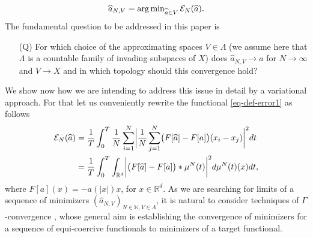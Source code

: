 \begin{equation}\label{fdproxy}
\widehat a_{N,V} = \operatorname{arg\,min}_{\widehat a \in V} \mathcal E_N(\widehat a).
\end{equation}
The fundamental question to be addressed in this paper is
\begin{itemize}
\item[(Q)] For which choice of the approximating spaces $V \in \Lambda$ (we assume here that $\Lambda$ is a countable family of invading subspaces of $X$) does $\widehat a_{N,V} \to a$ for $N \to \infty$ and $V \to X$ and 
in which topology should this convergence hold?
\end{itemize}
We show now how  we are intending to address this issue in detail by a variational approach.
For that let us conveniently rewrite the functional \eqref{eq-def-error1} as follows
\begin{align}\label{pirlo}
	\begin{split}
	\mathcal E_N(\widehat a) & = \frac{1}{T}\int_0^T\frac{1}{N}\sum_{i=1}^N\biggl|\frac{1}{N}\sum_{j=1}^N
			\bigl(F[\widehat a]-F[a]\bigr)(x_i-x_j)\biggr|^2 dt\\
			& = \frac{1}{T}\int_0^T \int_{\mathbb{R}^d} \biggl|\bigl(F[\widehat a]-F[a]\bigr)\ast\mu^N(t)\biggr|^2d\mu^N(t)(x)dt,
	\end{split}
\end{align}
where $F[a](x) =-a(| x |)x$, for $x \in \mathbb R^{d}$.  As we are searching for limits of a sequence of minimizers $(\widehat a_{N,V})_{N \in \mathbb N, V \in \Lambda}$, it is natural to consider  techniques of $\Gamma$-convergence \cite{MR1201152}, whose general aim is establishing the convergence of minimizers for a sequence of equi-coercive functionals to minimizers of a target functional.


